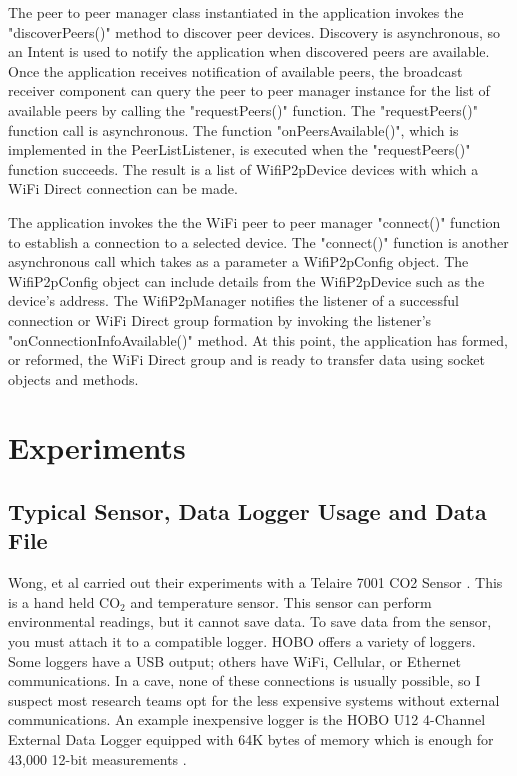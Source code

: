 \documentclass[10pt,twocolumn]{article}
\begin{document}
The peer to peer manager class instantiated in the application invokes the "discoverPeers()" method to discover peer devices.
Discovery is asynchronous, so an Intent is used to notify the application when discovered peers are available.
Once the application receives notification of available peers, the broadcast receiver component can query the peer to peer manager instance for the list of available peers by calling the "requestPeers()" function.
The "requestPeers()" function call is asynchronous.
The function "onPeersAvailable()", which is implemented in the PeerListListener, is executed when the "requestPeers()" function succeeds. 
The result is a list of WifiP2pDevice devices with which a WiFi Direct connection can be made. \cite{androidp2p}

The application invokes the the WiFi peer to peer manager "connect()" function to establish a connection to a selected device.
The "connect()" function is another asynchronous call which takes as a parameter a WifiP2pConfig object.
The WifiP2pConfig object can include details from the WifiP2pDevice such as the device's address.
The WifiP2pManager notifies the listener of a successful connection or WiFi Direct group formation by invoking the listener's "onConnectionInfoAvailable()" method.
At this point, the application has formed, or reformed, the WiFi Direct group and is ready to transfer data using socket objects and methods.

\section{Experiments}

\subsection{Typical Sensor, Data Logger Usage and Data File}
\label{sec:TypicalUsage}
Wong, et al carried out their experiments with a Telaire 7001 CO2 Sensor \cite{telaire} \cite{wong2010}. 
This is a hand held CO$_2$ and temperature sensor.
This sensor can perform environmental readings, but it cannot save data.
To save data from the sensor, you must attach it to a compatible logger.
HOBO offers a variety of loggers.
Some loggers have a USB output; others have WiFi, Cellular, or Ethernet communications.
In a cave, none of these connections is usually possible, so I suspect most research teams opt for the less expensive systems without external communications.
An example inexpensive logger is the HOBO U12 4-Channel External Data Logger equipped with 64K bytes of memory which is enough for 43,000 12-bit measurements \cite{logger}. 
\end{document}
